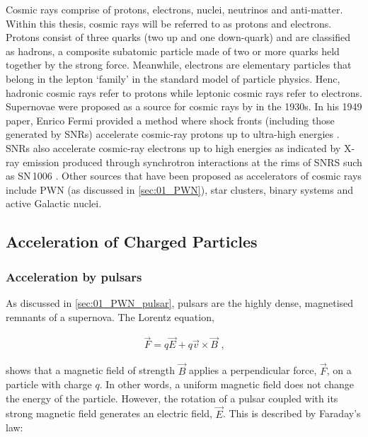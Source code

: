 \newpar
Cosmic rays comprise of protons, electrons, nuclei, neutrinos and anti-matter. Within this thesis, cosmic rays will be referred to as protons and electrons. Protons consist of three quarks (two up and one down-quark) and are classified as hadrons, a composite subatomic particle made of two or more quarks held together by the strong force. Meanwhile, electrons are elementary particles that belong in the lepton `family' in the standard model of particle physics. Henc, hadronic cosmic rays refer to protons while leptonic cosmic rays refer to electrons.
\newpar 
Supernovae were proposed as a source for cosmic rays by \cite{1934PNAS...20..259B} in the 1930s. In his 1949 paper, Enrico Fermi provided a method where shock fronts (including those generated by SNRs) accelerate cosmic-ray protons up to ultra-high energies \citep{1949PhRv...75.1169F}. SNRs also accelerate cosmic-ray electrons up to high energies as indicated by X-ray emission produced through synchrotron interactions at the rims of SNRS such as \mbox{SN\,1006} \citep{1995Natur.378..255K}.
\newpar
Other sources that have been proposed as accelerators of cosmic rays include PWN (as discussed in \autoref{sec:01_PWN}), star clusters, binary systems and active Galactic nuclei.

\subsection{Acceleration of Charged Particles}

\subsubsection{Acceleration by pulsars}

As discussed in \autoref{sec:01_PWN_pulsar}, pulsars are the highly dense, magnetised remnants of a supernova. The Lorentz equation,

\begin{equation}
    \begin{aligned}
        \vec{F}=q\vec{E} + q\vec{v}\times \vec{B}\text{ ,}
    \end{aligned} \label{eq:chapter_1_lorentz_force}
\end{equation}

\noindent shows that a magnetic field of strength $\vec{B}$ applies a perpendicular force, $\vec{F}$, on a particle with charge $q$. In other words, a uniform magnetic field does not change the energy of the particle. However, the rotation of a pulsar coupled with its strong magnetic field generates an electric field, $\vec{E}$. This is described by Faraday's law:
 
